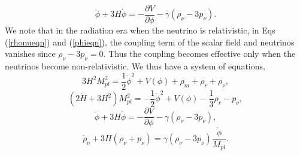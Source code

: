 \documentclass[prd,twocolumn,superscriptaddress]{revtex4}
\begin{document}
\begin{equation}
\ddot{\phi} + 3 H \dot{\phi} = - \frac{\partial V}{\partial \phi}
- \gamma \left( \rho_{\nu} - 3 p_{\nu} \right) . \label{phieqn}
\end{equation}
 We note that in the radiation era when the neutrino is relativistic, in Eqs (\ref{rhonueqn}) and (\ref{phieqn}),
the coupling term of the scalar field and neutrinos vanishes since
$\rho_{\nu}-3 p_{\nu}=0$. Thus the coupling becomes effective only when the neutrinos become non-relativistic. We thus have a system of equations,
\begin{equation}
3 H^2 M_{pl}^2 = \frac{1}{2} \dot{\phi}^2 + V(\phi) + \rho_m + \rho_r + \rho_{\nu},
\end{equation}
\begin{equation}
(2 \dot{H} + 3 H^2) M_{pl}^2 = - \frac{1}{2} \dot{\phi}^2 + V(\phi) - \frac{1}{3} \rho_r - p_{\nu},
\end{equation}
\begin{equation}
\ddot{\phi} + 3 H \dot{\phi} = - \frac{\partial V}{\partial \phi}
- \gamma \left( \rho_{\nu} - 3 p_{\nu} \right),
\end{equation}
\begin{equation}
\dot{\rho}_{\nu} + 3 H \left( \rho_{\nu} + p_{\nu} \right)
= \gamma \left( \rho_{\nu} - 3 p_{\nu} \right) \frac{\dot{\phi}}{M_{pl}} .
\end{equation}
\end{document}
